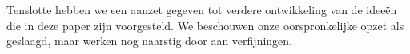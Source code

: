 \documentclass{article}
\begin{document}
Tenslotte hebben we een aanzet gegeven tot verdere ontwikkeling van de idee\"en
die in deze paper zijn voorgesteld. We beschouwen onze oorspronkelijke opzet als
geslaagd, maar werken nog naarstig door aan verfijningen.


\nocite{*}


\end{document}
